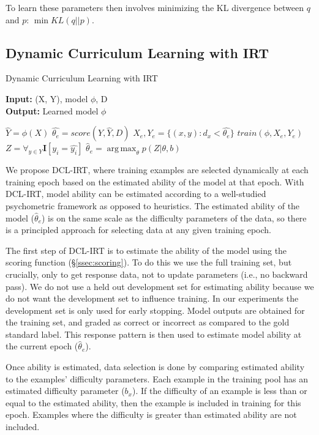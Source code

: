 \documentclass[letterpaper]{article} %
\begin{document}
To learn these parameters then involves minimizing the KL divergence between $q$ and $p$: $\min KL(q \vert \vert p)$. 

\subsection{Dynamic Curriculum Learning with IRT}
\label{ssec:dcl}
\begin{algorithm}[t]
	\caption{Dynamic Curriculum Learning with IRT}
	\hspace*{\algorithmicindent}\textbf{Input:} (X, Y), model $\phi$, D \\
	\hspace*{\algorithmicindent}\textbf{Output:} Learned model $\phi$ 
	\begin{algorithmic}[1]
		\State $\hat{Y} = \phi(X)$
		\State $\hat{\theta_e} = score(Y, \hat{Y}, D)$
		\State $X_e, Y_e = \{(x,y): d_x < \hat{\theta_e}\}$
		\State $train(\phi, X_e, Y_e)$
		\EndWhile 
		\State $Z = \forall_{y \in Y} \mathbf{I}[y_i = \hat{y_i}]$
		\State $\hat{\theta}_e = \operatorname*{arg\,max}_\theta p(Z \vert \theta, b)$
		\EndProcedure 
	\end{algorithmic} 
	\label{alg:dcl}
\end{algorithm} 
We propose DCL-IRT, where training examples are selected dynamically at each training epoch based on the estimated ability of the model at that epoch.
With DCL-IRT, model ability can be estimated according to a well-studied psychometric framework as opposed to heuristics.
The estimated ability of the model ($\hat{\theta}_e$) is on the same scale as the difficulty parameters of the data, so there is a principled approach for selecting data at any given training epoch.

The first step of DCL-IRT is to estimate the ability of the model using the scoring function (\S \ref{ssec:scoring}). 
To do this we use the full training set, but crucially, only to get response data, not to update parameters (i.e., no backward pass). 
We do not use a held out development set for estimating ability because we do not want the development set to influence training.
In our experiments the development set is only used for early stopping.
Model outputs are obtained for the training set, and graded as correct or incorrect as compared to the gold standard label. 
This response pattern is then used to estimate model ability at the current epoch ($\hat{\theta}_e$).

Once ability is estimated, data selection is done by comparing estimated ability to the examples' difficulty parameters.
Each example in the training pool has an estimated difficulty parameter ($b_x$).
If the difficulty of an example is less than or equal to the estimated ability, then the example is included in training for this epoch.
Examples where the difficulty is greater than estimated ability are not included.
\end{document}

